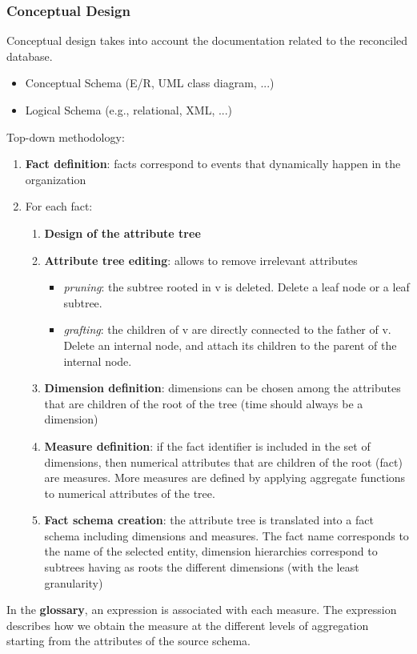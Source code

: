 \documentclass[10pt,a4paper]{article}
\begin{document}
\begin{justify}
\subsubsection{Conceptual Design}
Conceptual design takes into account the documentation related to the reconciled database.
\begin{itemize}
	\item Conceptual Schema (E/R, UML class diagram, ...)
	\item Logical Schema (e.g., relational, XML, ...)
\end{itemize}
Top-down methodology:
\begin{enumerate}
	\item \textbf{Fact definition}: facts correspond to events that dynamically happen in the organization 
	\item For each fact:
	\begin{enumerate}
		\item \textbf{Design of the attribute tree}
		\item \textbf{Attribute tree editing}: allows to remove irrelevant attributes
		\begin{itemize}
			\item \textit{pruning}: the subtree rooted in v is deleted. Delete a leaf node or a leaf subtree.
			\item \textit{grafting}: the children of v are directly connected to the father of v. Delete an internal node, and attach its children to the parent of the internal node.
		\end{itemize}
		\item \textbf{Dimension definition}: dimensions can be chosen among the attributes that are children of the root of the tree (time should always be a dimension)
		\item \textbf{Measure definition}: if the fact identifier is included in the set of dimensions, then numerical attributes that are children of the root (fact) are measures. More measures are defined by applying aggregate functions to numerical attributes of the tree.
		\item \textbf{Fact schema creation}: the attribute tree is translated into a fact schema including dimensions and measures. The fact name corresponds to the name of the selected entity, dimension hierarchies correspond to subtrees having as roots the different dimensions (with the least granularity)
	\end{enumerate}
\end{enumerate}
In the \textbf{glossary}, an expression is associated with each measure. The expression describes how we obtain the measure at the different levels of aggregation starting from the attributes of the source schema. 
\pagebreak

\end{justify}
\end{document}
